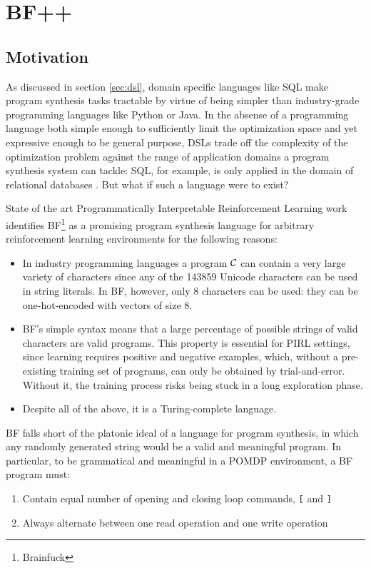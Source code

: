 \chapter{BF++}\label{ch:bfpp}


\section{Motivation}

As discussed in section \ref{sec:dsl}, domain specific languages like SQL make program synthesis tasks tractable by virtue of being simpler than industry-grade programming languages like Python or Java.
In the absense of a programming language both simple enough to sufficiently limit the optimization space and yet expressive enough to be general purpose, DSLs trade off the complexity of the optimization problem against the range of application domains a program synthesis system can tackle: SQL, for example, is only applied in the domain of relational databases \cite{atzeniRelationalDatabaseTheory1993}.
But what if such a language were to exist?

State of the art Programmatically Interpretable Reinforcement Learning work \cite{abolafiaNeuralProgramSynthesis2018} identifies BF\footnote{Brainfuck} \cite{brainfuck} as a promising program synthesis language for arbitrary reinforcement learning environments for the following reasons:
\begin{itemize}
    \item In industry programming languages a program $\mathcal{C}$ can contain a very large variety of characters since any of the 143859 Unicode \cite{allenUnicodeStandard2012} characters can be used in string literals. In BF, however, only 8 characters can be used: they can be one-hot-encoded with vectors of size 8. 
    \item BF's simple syntax means that a large percentage of possible strings of valid characters are valid programs. 
    This property is essential for PIRL settings, since learning requires positive and negative examples, which, without a pre-existing training set of programs, can only be obtained by trial-and-error.
    Without it, the training process risks being stuck in a long exploration phase.
    \item Despite all of the above, it is a Turing-complete language.
\end{itemize}

BF falls short of the platonic ideal of a language for program synthesis, in which any randomly generated string would be a valid and meaningful program.
In particular, to be grammatical and meaningful in a POMDP environment, a BF program must:
\begin{enumerate}
    \item Contain equal number of opening and closing loop commands, \texttt{[} and \texttt{]}
    \item Always alternate between one read operation and one write operation
\end{enumerate}

